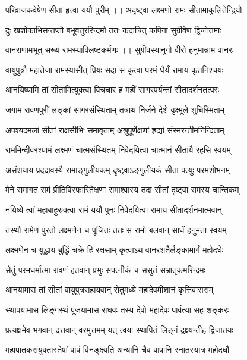 \twolineshloka
{परिव्राजकवेषेण सीतां हृत्वा ययौ पुरीम् ।।}
{अदृष्ट्वा लक्ष्मणो रामः सीतामाकुलितेन्द्रियौ} %

\twolineshloka
{दुः खशोकाभिसन्तप्तौ बभूवतुररिन्दमौ}
{ततः कदाचित् कपिना सुग्रीवेण द्विजोत्तमाः} %

\twolineshloka
{वानराणामभूत् सख्यं रामस्याक्लिष्टकर्मणः ।।}
{सुग्रीवस्यानुगो वीरो हनुमान्नाम वानरः} %

\twolineshloka
{वायुपुत्रौ महातेजा रामस्यासीत् प्रियः सदा}
{स कृत्वा परमं धैर्यं रामाय कृतनिश्चयः} %

\twolineshloka
{आनयिष्यामि तां सीतामित्युक्त्वा विचचार ह}
{महीं सागरपर्यन्तां सीतादर्शनतत्परः} %

\twolineshloka
{जगाम रावणपुरीं लङ्कां सागरसंस्थिताम्}
{तत्राथ निर्जने देशे वृक्ष्मूले शुचिस्मिताम्} %

\twolineshloka
{अपश्यदमलां सीतां राक्षसीभिः समावृताम्}
{अश्रुपूर्णेक्षणां हृद्यां संस्मरन्तीमनिन्दिताम्} %

\twolineshloka
{राममिन्दीवरश्यामं लक्ष्मणं चात्मसंस्थितम्}
{निवेदयित्वा चात्मानं सीतायै रहसि स्वयम्} %

\twolineshloka
{असंशयाय प्रददावस्यै रामाङ्‌गुलीयकम्}
{दृष्ट्वाऽङ्‌गुलीयकं सीता पत्युः परमशोभनम्} %

\twolineshloka
{मेने समागतं रामं प्रीतिविस्फारितेक्षणा}
{समाश्वास्य तदा सीतां दृष्ट्वा रामस्य चान्तिकम्} %

\twolineshloka
{नयिष्ये त्वां महाबाहुरुक्त्वा रामं ययौ पुनः}
{निवेदयित्वा रामाय सीतादर्शनमात्मवान्} %

\twolineshloka
{तस्थौ रामेण पुरतो लक्ष्मणेन च पूजितः}
{ततः स रामो बलवान् सार्धं हनुमता स्वयम्} %

\twolineshloka
{लक्ष्मणेन च युद्धाय बुद्धिं चक्रे हि रक्षसाम्}
{कृत्वाऽथ वानरशतैर्लङ्कामार्गं महोदधेः} %

\twolineshloka
{सेतुं परमधर्मात्मा रावणं हतवान् प्रभुः}
{सपत्नीकं च ससुतं सभ्रातृकमरिन्दमः} %

\twolineshloka
{आनयामास तां सीतां वायुपुत्रसहायवान्}
{सेतुमध्ये महादेवमीशानं कृत्तिवाससम्} %

\twolineshloka
{स्थापयामास लिङ्गस्थं पूजयामास राघवः}
{तस्य देवो महादेवः पार्वत्या सह शङ्करः} %

\twolineshloka
{प्रत्यक्षमेव भगवान् दत्तवान् वरमुत्तमम्}
{यत् त्वया स्थापितं लिङ्गं द्रक्ष्यन्तीह द्विजातयः} %

\twolineshloka
{महापातकसंयुक्तास्तेषां पापं विनङ्क्ष्यति}
{अन्यानि चैव पापानि स्नातस्यात्र महोदधौ} %

